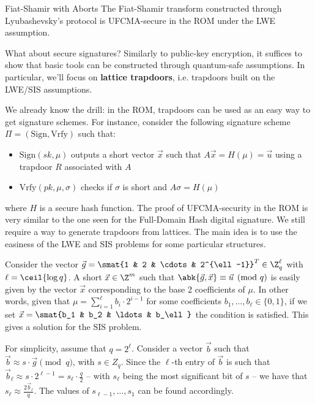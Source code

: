 \documentclass[a4paper, 12pt]{report}
\begin{document}
    \begin{framedcor}{Fiat-Shamir with Aborts}
        The Fiat-Shamir transform constructed through Lyubashevsky's protocol is UFCMA-secure in the ROM under the LWE assumption.
    \end{framedcor}


    What about secure signatures? Similarly to public-key encryption, it suffices to show that basic tools can be constructed through quantum-safe assumptions. In particular, we'll focus on \textbf{lattice trapdoors}, i.e. trapdoors built on the LWE/SIS assumptions.

    We already know the drill: in the ROM, trapdoors can be used as an easy way to get signature schemes. For instance, consider the following signature scheme $\Pi = (\mathrm{Sign}, \mathrm{Vrfy})$ such that:
    \begin{itemize}
        \item $\mathrm{Sign}(sk, \mu)$ outputs a short vector $\vec x$ such that $A \vec x = H(\mu) = \vec u$ using a trapdoor $R$ associated with $A$

        \item $\mathrm{Vrfy}(pk, \mu, \sigma)$ checks if $\sigma$ is short and $A \sigma = H(\mu)$
    \end{itemize}
    
    where $H$ is a secure hash function. The proof of UFCMA-security in the ROM is very similar to the one seen for the Full-Domain Hash digital signature. We still require a way to generate trapdoors from lattices. The main idea is to use the easiness of the LWE and SIS problems for some particular structures.

    Consider the vector $\vec g = \smat{1 & 2 & \cdots & 2^{\ell-1}}^T \in \Z_{q}^{\ell}$ with $\ell = \ceil{\log q}$. A short $\vec x \in \Z^m$ such that $\abk{\vec g, \vec x} \equiv \vec u \pmod q$ is easily given by the vector $\vec x$ corresponding to the base 2 coefficients of $\mu$. In other words, given that $\mu = \sum_{i = 1}^{\ell} b_i \cdot 2^{i-1}$ for some coefficients $b_1, \ldots, b_\ell \in \{0,1\}$, if we set $\vec x = \smat{b_1 & b_2 & \ldots & b_\ell}$ the condition is satisfied. This gives a solution for the SIS problem.

    For simplicity, assume that $q = 2^\ell$. Consider a vector $\vec b$ such that $\vec b \approx s \cdot \vec g \pmod q$, with $s \in Z_q$. Since the $\ell$-th entry of $\vec b$ is such that $\vec b_\ell \approx s \cdot 2^{\ell-1} = s_\ell \cdot \frac{q}{2}$ -- with $s_\ell$ being the most significant bit of $s$ -- we have that $s_\ell \approx \frac{2\vec b_\ell}{q}$. The values of $s_{\ell-1}, \ldots, s_1$ can be found accordingly.
\end{document}
